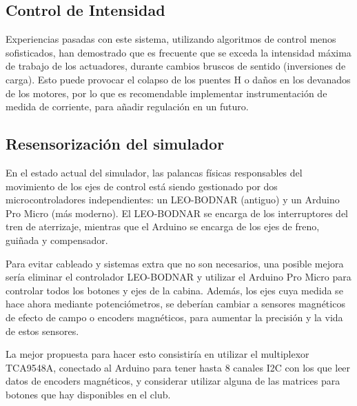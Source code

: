 \documentclass[sans]{cdvreport}
\begin{document}
\subsection{Control de Intensidad}
Experiencias pasadas con este sistema, utilizando algoritmos de control menos sofisticados, han demostrado que es frecuente que se exceda la intensidad máxima de trabajo de los actuadores, durante cambios bruscos de sentido (inversiones de carga). Esto puede provocar el colapso de los puentes H o daños en los devanados de los motores, por lo que es recomendable implementar instrumentación de medida de corriente, para añadir regulación en un futuro.

\subsection{Resensorización del simulador}
En el estado actual del simulador, las palancas físicas responsables del movimiento de los ejes de control está siendo gestionado por dos microcontroladores independientes: un LEO-BODNAR (antiguo) y un Arduino Pro Micro (más moderno). El LEO-BODNAR se encarga de los interruptores del tren de aterrizaje, mientras que el Arduino se encarga de los ejes de freno, guiñada y compensador.
\par Para evitar cableado y sistemas extra que no son necesarios, una posible mejora sería eliminar el controlador LEO-BODNAR y utilizar el Arduino Pro Micro para controlar todos los botones y ejes de la cabina. Además, los ejes cuya medida se hace ahora mediante potenciómetros, se deberían cambiar a sensores magnéticos de efecto de campo o encoders magnéticos, para aumentar la precisión y la vida de estos sensores.
\par La mejor propuesta para hacer esto consistiría en utilizar el multiplexor TCA9548A, conectado al Arduino para tener hasta 8 canales I2C con los que leer datos de encoders magnéticos, y considerar utilizar alguna de las matrices para botones que hay disponibles en el club.

\newpage
\listoftodos
\newpage

\appendix
\end{document}
